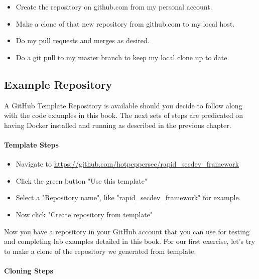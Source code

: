 \begin{itemize}

\item
  Create the repository on github.com from my personal account.
\item
  Make a clone of that new repository from github.com to my local host.
\item
  Do my pull requests and merges as desired.
\item
  Do a git pull to my master branch to keep my local clone up to date.
\end{itemize}


\subsection{Example Repository}

\justify
A GitHub Template Repository is available should you decide to follow
along with the code examples in this book. The next sets of steps are
predicated on having Docker installed and running as described in the
previous chapter.


\paragraph{Template Steps}

\begin{itemize}

\item
  Navigate to
  \url{https://github.com/hotpeppersec/rapid_secdev_framework}
\item
  Click the green button "Use this template"
\item
  Select a "Repository name", like "rapid\_secdev\_framework" for
  example.
\item
  Now click "Create repository from template"
\end{itemize}

\justify
Now you have a repository in your GitHub account that you can use for
testing and completing lab examples detailed in this book. For our first
exercise, let's try to make a clone of the repository we generated from
template.


\paragraph{Cloning Steps}

